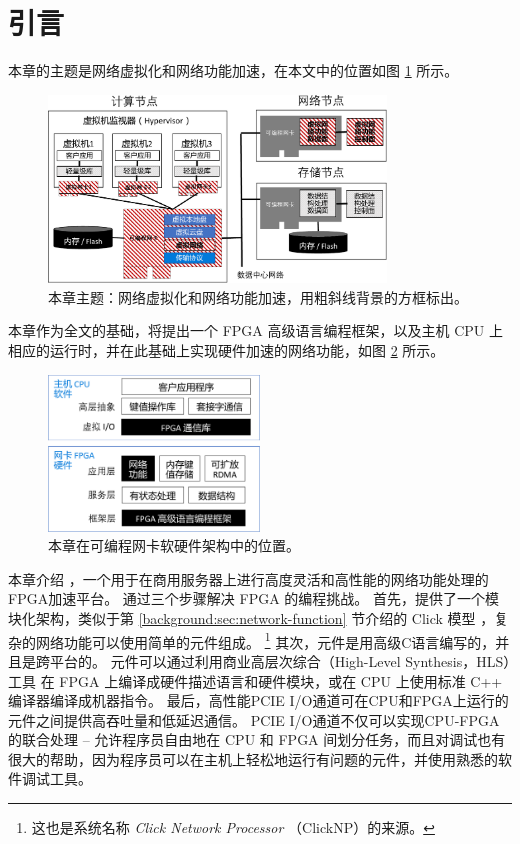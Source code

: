 \section{引言}

本章的主题是网络虚拟化和网络功能加速，在本文中的位置如图 \ref{clicknp:fig:sys-arch} 所示。

\begin{figure}[htbp]
	\centering
	\includegraphics[width=0.8\textwidth]{image/sys_arch.pdf}
	\caption{本章主题：网络虚拟化和网络功能加速，用粗斜线背景的方框标出。}
	\label{clicknp:fig:sys-arch}
\end{figure}

本章作为全文的基础，将提出一个 FPGA 高级语言编程框架，以及主机 CPU 上相应的运行时，并在此基础上实现硬件加速的网络功能，如图 \ref{clicknp:fig:sw-hw-codesign} 所示。

\begin{figure}[htbp]
	\centering
	\includegraphics[width=0.5\textwidth]{image/sw_hw_codesign.pdf}
	\caption{本章在可编程网卡软硬件架构中的位置。}
	\label{clicknp:fig:sw-hw-codesign}
\end{figure}

本章介绍 \name{}，一个用于在商用服务器上进行高度灵活和高性能的网络功能处理的FPGA加速平台。
\name{} 通过三个步骤解决 FPGA 的编程挑战。
首先，提供了一个模块化架构，类似于第 \ref{background:sec:network-function} 节介绍的 Click 模型 \cite {kohler2000click}，复杂的网络功能可以使用简单的元件组成。
\footnote{这也是系统名称 \textit{Click Network Processor} （ClickNP）的来源。}
其次，\name 元件是用高级C语言编写的，并且是跨平台的。
\name 元件可以通过利用商业高层次综合（High-Level Synthesis，HLS）工具 \cite {vivado,aoc,sdaccel} 在 FPGA 上编译成硬件描述语言和硬件模块，或在 CPU 上使用标准 C++ 编译器编译成机器指令。
最后，高性能PCIE I/O通道可在CPU和FPGA上运行的元件之间提供高吞吐量和低延迟通信。
PCIE I/O通道不仅可以实现CPU-FPGA的联合处理 -- 允许程序员自由地在 CPU 和 FPGA 间划分任务，而且对调试也有很大的帮助，因为程序员可以在主机上轻松地运行有问题的元件，并使用熟悉的软件调试工具。

